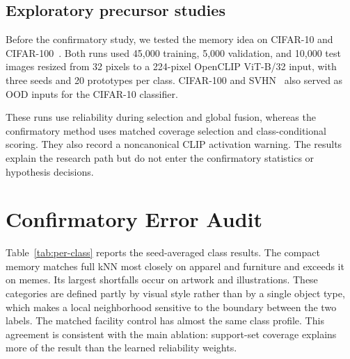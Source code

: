 \documentclass[10pt,twocolumn]{article}
\begin{document}
\subsection{Exploratory precursor studies}
\label{sec:precursor-protocol}

Before the confirmatory study, we tested the memory idea on CIFAR-10 and
CIFAR-100~\cite{krizhevsky2009learning}. Both runs used 45,000 training, 5,000
validation, and 10,000 test images resized from 32 pixels to a 224-pixel OpenCLIP
ViT-B/32 input, with three seeds and 20 prototypes per class. CIFAR-100 and
SVHN~\cite{netzer2011reading} also served as OOD inputs for the CIFAR-10 classifier.

These runs use reliability during selection and global fusion, whereas the confirmatory
method uses matched coverage selection and class-conditional scoring. They also record
a noncanonical CLIP activation warning. The results explain the research path but do
not enter the confirmatory statistics or hypothesis decisions.

\section{Confirmatory Error Audit}

Table~\ref{tab:per-class} reports the seed-averaged class results. The compact memory
matches full kNN most closely on apparel and furniture and exceeds it on memes. Its
largest shortfalls occur on artwork and illustrations. These categories are defined
partly by visual style rather than by a single object type, which makes a local
neighborhood sensitive to the boundary between the two labels. The matched facility
control has almost the same class profile. This agreement is consistent with the main
ablation: support-set coverage explains more of the result than the learned reliability
weights.
\end{document}
